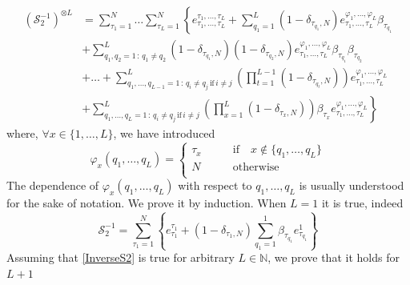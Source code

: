 \documentclass[10pt]{article}
\numberwithin{equation}{section}
\numberwithin{equation}{subsection}
\begin{document}
    \begin{equation}\label{InverseS2}
    	\begin{split}
    		\left(\mathcal{S}_{2}^{-1}\right)^{\otimes L}&=\sum_{\tau_{1}=1}^{N}\ldots\sum_{\tau_{L}=1}^{N}\left\{e_{\tau_{1},\ldots,\tau_{L}}^{\tau_{1},\ldots,\tau_{L}}+\sum_{q_{1}=1}^{L}(1-\delta_{\tau_{q_{1}},N})e_{\tau_{1},\ldots,\tau_{L}}^{\varphi_{1},\ldots,\varphi_{L}}\beta_{\tau_{q_{1}}}\right. 
    		\\&+\left. \sum_{q_{1},q_{2}=1\,:\,q_{1}\neq q_{2}}^{L}(1-\delta_{\tau_{q_{1}},N})(1-\delta_{\tau_{q_{2}},N})e^{\varphi_{1},\ldots,\varphi_{L}}_{\tau_{1},\ldots,\tau_{L}}\beta_{\tau_{q_{1}}}\beta_{\tau_{q_{2}}}\right.
    		\\&+\left.
    		\ldots+	\sum_{q_{1},\ldots,q_{L-1}=1\,:\,q_{i}\neq q_{j}\,\text{if}\,i\neq j}^{L}\left(\prod_{t=1}^{L-1}(1-\delta_{\tau_{q_{t}},N})\right)e_{\tau_{1},\ldots,\tau_{L}}^{\varphi_{1},\ldots,\varphi_{L}}
    		\right. \\&+ \left. 
    		\sum_{q_{1},\ldots,q_{L}=1\,:\,q_{i}\neq q_{j}\,\text{if}\,i\neq j}^{L}\left(\prod_{x=1}^{L}(1-\delta_{\tau_{x},N})\right)\beta_{\tau_{x}}e_{\tau_{1},\ldots,\tau_{L}}^{\varphi_{1},\ldots,\varphi_{L}} \right\}
    	\end{split}
    \end{equation}
where, $\forall x\in\{1,\ldots,L\}$, we have introduced
\begin{equation}
	\varphi_{x}(q_{1},\ldots,q_{L})=\begin{cases}
		\tau_{x}\qquad &\text{if}\quad x\notin\{q_{1},\ldots,q_{L}\}\\
		N\qquad &\text{otherwise}\\
	\end{cases}
\end{equation}
The dependence of $\varphi_{x}(q_{1},\ldots,q_{L})$ with respect to $q_{1},\ldots,q_{L}$ is usually understood for the sake of notation.
    We prove it by induction. When $L=1$ it is true, indeed
    \begin{equation}
    	\mathcal{S}_{2}^{-1}=\sum_{\tau_{1}=1}^{N}\left\{e_{\tau_{1}}^{\tau_{1}}+(1-\delta_{\tau_{1},N})\sum_{q_{1}=1}^{1}\beta_{\tau_{q_{1}}}e_{\tau_{q_{1}}}^{1}\right\}
    \end{equation}
    Assuming that \eqref{InverseS2} is true for arbitrary $L\in \mathbb{N}$, we prove that it holds for $L+1$
\end{document}
